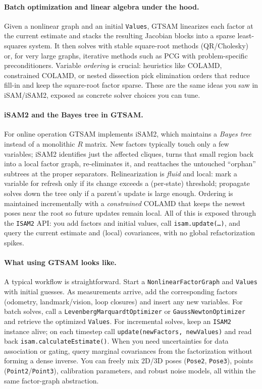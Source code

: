 \paragraph{Batch optimization and linear algebra under the hood.}
Given a nonlinear graph and an initial \texttt{Values}, GTSAM linearizes each factor at the current estimate and stacks the resulting Jacobian blocks into a sparse least-squares system. It then solves with stable square-root methods (QR/Cholesky) or, for very large graphs, iterative methods such as PCG with problem-specific preconditioners. Variable \emph{ordering} is crucial: heuristics like COLAMD, constrained COLAMD, or nested dissection pick elimination orders that reduce fill-in and keep the square-root factor sparse. These are the same ideas you saw in iSAM/iSAM2, exposed as concrete solver choices you can tune. \cite{GTSAM_handbook,iSAM2_paper}

\paragraph{iSAM2 and the Bayes tree in GTSAM.}
For online operation GTSAM implements iSAM2, which maintains a \emph{Bayes tree} instead of a monolithic \(R\) matrix. New factors typically touch only a few variables; iSAM2 identifies just the affected cliques, turns that small region back into a local factor graph, re-eliminates it, and reattaches the untouched “orphan” subtrees at the proper separators. Relinearization is \emph{fluid} and local: mark a variable for refresh only if its change exceeds a (per-state) threshold; propagate solves down the tree only if a parent’s update is large enough. Ordering is maintained incrementally with a \emph{constrained} COLAMD that keeps the newest poses near the root so future updates remain local. All of this is exposed through the \texttt{ISAM2} API: you add factors and initial values, call \texttt{isam.update(\dots)}, and query the current estimate and (local) covariances, with no global refactorization spikes. \cite{iSAM2_paper,Bayes_tree_for_SLAM_paper}

\paragraph{What using GTSAM looks like.}
A typical workflow is straightforward. Start a \texttt{NonlinearFactorGraph} and \texttt{Values} with initial guesses. As measurements arrive, add the corresponding factors (odometry, landmark/vision, loop closures) and insert any new variables. For batch solves, call a \texttt{LevenbergMarquardtOptimizer} or \texttt{GaussNewtonOptimizer} and retrieve the optimized \texttt{Values}. For incremental solves, keep an \texttt{ISAM2} instance alive; on each timestep call \texttt{update(newFactors, newValues)} and read back \texttt{isam.calculateEstimate()}. When you need uncertainties for data association or gating, query marginal covariances from the factorization without forming a dense inverse. You can freely mix 2D/3D poses (\texttt{Pose2}, \texttt{Pose3}), points (\texttt{Point2}/\texttt{Point3}), calibration parameters, and robust noise models, all within the same factor-graph abstraction. \cite{GTSAM_handbook}

